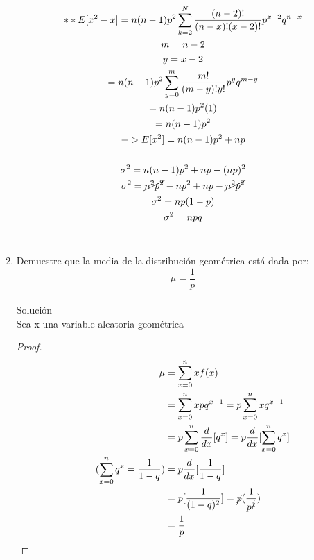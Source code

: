 \begin{enumerate}
\begin{gather*}
    **E[x^2 - x] = n(n-1)p^2 \displaystyle\sum_{k=2}^N \frac{(n-2)!}{(n-x)!(x-2)!}p^{x-2}q^{n-x}\\
    m = n -2\\
    y = x-2\\
    = n(n-1)p^2\displaystyle\sum_{y=0}^m \frac{m!}{(m-y)!y!}p^yq^{m-y}\\
    = n(n-1)p^2(1)\\
    = n(n-1)p^2\\
    -> E[x^2] = n(n-1)p^2 + np\\\\
    \sigma^2 = n(n-1)p^2 +np -(np)^2\\
    \sigma^2 = \cancel{n^2p^2} - np^2 +np - \cancel{n^2p^2}\\
    \sigma^2 = np(1-p)\\
    \sigma^2 = npq
    \end{gather*}\\
    
    \item Demuestre que la media de la distribución geométrica está dada por:
    $$ \mu = \frac{1}{p}$$\\
    Solución\\
    Sea x una variable aleatoria geométrica
    \begin{proof}
        \begin{align*}
        \mu &= \displaystyle\sum_{x=0}^n xf(x)\\
        &= \displaystyle\sum_{x=0}^n xpq^{x-1} = p \displaystyle\sum_{x=0}^n xq^{x-1}\\
        &= p \displaystyle\sum_{x=0}^n \frac{d}{dx}[q^x] = p \frac{d}{dx}[\displaystyle\sum_{x=0}^n q^x]\\
        \tag{$\displaystyle\sum_{x=0}^n q^x = \frac{1}{1-q}$}
        &= p\frac{d}{dx}[\frac{1}{1-q}]\\
        &= p[\frac{1}{(1-q)^2}]= \cancel{p}(\frac{1}{p^{\cancel{2}}})\\
        &= \frac{1}{p}
        \end{align*}
    \end{proof}
     

\end{enumerate}
